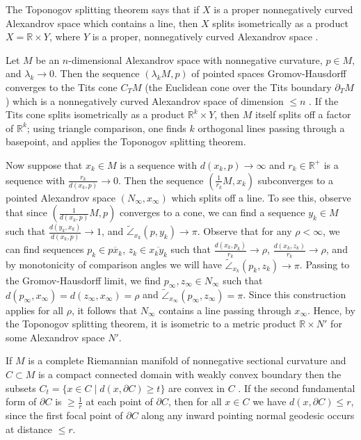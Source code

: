 \documentclass[12pt]{amsart}
\newcommand{\R}{{\mathbb R}}
\newcommand{\cangle}{\widetilde{\angle}}
\newcommand{\ctits}{C_T}
\newcommand{\la}{\lambda}
\newcommand{\ol}{\overline}
\newcommand{\ra}{\rightarrow}
\newcommand{\tits}{\partial_T}
\numberwithin{equation}{section}
\theoremstyle{plain}
\theoremstyle{definition}
\theoremstyle{remark}
\begin{document}
The Toponogov splitting theorem says that if $X$ is a
proper nonnegatively curved Alexandrov space which contains a line, then $X$
splits isometrically as a product $X=\R\times Y$, where
$Y$ is a proper, nonnegatively curved Alexandrov space
\cite[Theorem 10.5.1]{Burago-Burago-Ivanov}.

Let $M$ be an $n$-dimensional Alexandrov space with nonnegative curvature,
$p\in M$,
and $\la_k\ra 0$. Then the sequence $(\la_kM,p)$ of pointed spaces
Gromov-Hausdorff converges to the Tits cone $\ctits M$
(the Euclidean cone over the Tits boundary $\tits M$)
which is a nonnegatively curved Alexandrov
space of dimension $\leq n$
\cite[p. 58-59]{Ballmann-Gromov-Schroeder}.  
If the Tits cone splits isometrically
as a product $\R^k\times Y$, then $M$ itself splits off
a factor of $\R^k$; using triangle comparison, one finds $k$
orthogonal lines passing through a basepoint, and applies the
Toponogov splitting theorem.  

Now suppose that $x_k\in M$ is a sequence with $d(x_k,p)\ra\infty$
and $r_k \in \R^+$  is a sequence with  
$\frac{r_k}{d(x_k,p)}\ra 0$.  Then the sequence 
$(\frac{1}{r_k} M,x_k)$ 
subconverges to a pointed Alexandrov
space $(N_\infty,x_\infty)$ which splits off a line.  To see this,
observe that since 
$(\frac{1}{d(x_k,p)}M,p)$ 
converges to a cone,
we can find a 
sequence $y_k\in M$ such that $\frac{d(y_k,x_k)}{d(x_k,p)}\ra 1$,
and $\cangle_{x_k}(p,y_k)\ra\pi$.   
Observe that for any $\rho<\infty$,
we can find sequences $p_k\in \ol{px_k}$, $z_k\in\ol{x_ky_k}$
such that $\frac{d(x_k,p_k)}{r_k}\ra \rho$, 
$\frac{d(x_k,z_k)}{r_k}\ra \rho$, and by monotonicity of comparison
angles 
\cite[Chapter 4.3]{Burago-Burago-Ivanov}
we will have $\cangle_{x_k}(p_k,z_k)\ra \pi$.  Passing
to the Gromov-Hausdorff limit, we find $p_\infty, z_\infty\in N_\infty$
such that $d(p_\infty,x_\infty)=d(z_\infty,x_\infty)=\rho$ and 
$\cangle_{x_\infty}(p_\infty,z_\infty)=\pi$.  Since this
construction applies for all $\rho$, it follows that $N_\infty$
contains a line passing through $x_\infty$.
Hence, by the Toponogov splitting theorem, it is isometric
to a metric product $\R\times N'$ for some Alexandrov space
$N'$.

If $M$ is a complete Riemannian manifold of nonnegative sectional 
curvature and $C\subset M$ is a 
compact connected domain with weakly convex boundary then 
the subsets $C_t= \{x\in C\mid d(x,\partial C)\geq t\}$ 
are convex in $C$ 
\cite[Chapter 8]{Cheeger-Ebin}. 
If the second fundamental form of 
$\partial C$ is $\geq \frac{1}{r}$ at each point
of $\partial C$, then for all $x\in C$ we have $d(x,\partial C)\leq r$,
since the first focal point of $\partial C$ along any inward pointing
normal geodesic occurs at distance $\leq r$. 
\end{document}
